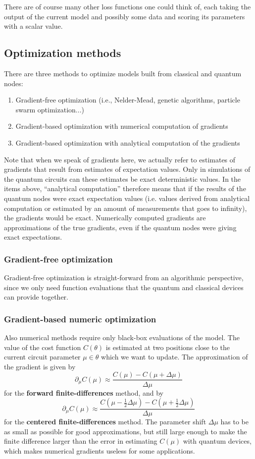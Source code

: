 \documentclass[aps,pra,10pt,twocolumn,groupedaddress,nofootinbib]{revtex4-1}
\theoremstyle{plain}
\begin{document}
There are of course many other loss functions one could think of, each taking the output of the current model and possibly some data and scoring its parameters with a scalar value.

\subsection{Optimization methods}

There are three methods to optimize models built from classical and quantum nodes:
\begin{enumerate}
\item Gradient-free optimization (i.e., Nelder-Mead, genetic algorithms, particle swarm optimization...)
\item Gradient-based optimization with numerical computation of gradients
\item Gradient-based optimization with analytical computation of the gradients
\end{enumerate}
Note that when we speak of gradients here, we actually refer to estimates of gradients that result from estimates of expectation values. Only in simulations of the quantum circuits can these estimates be exact deterministic values. In the items above, ``analytical computation'' therefore means that if the results of the quantum nodes were exact expectation values (i.e. values derived from analytical computation or estimated by an amount of measurements that goes to infinity), the gradients would be exact. Numerically computed gradients are approximations of the true gradients, even if the quantum nodes were giving exact expectations.

\subsubsection{Gradient-free optimization}
Gradient-free optimization is straight-forward from an algorithmic perspective, since we only need function evaluations that the quantum and classical devices can provide together.

\subsubsection{Gradient-based numeric optimization}

Also numerical methods require only black-box evaluations of the model. The value of the cost function $C(\theta)$ is estimated at two positions close to the current circuit parameter $\mu \in \theta$ which we want to update. The approximation of the gradient is given by
\[ \partial_{\mu} C(\mu) \approx \frac{C(\mu ) - C(\mu + \Delta \mu)}{\Delta \mu} \]
for the \textbf{forward finite-differences} method, and by
\[ \partial_{\mu} C(\mu) \approx \frac{C(\mu - \frac{1}{2}\Delta \mu ) - C(\mu + \frac{1}{2} \Delta \mu)}{\Delta \mu} \]
for the \textbf{centered finite-differences} method. The parameter shift $\Delta \mu$ has to be as small as possible for good approximations, but still large enough to make the finite difference larger than the error in estimating $C(\mu)$ with quantum devices, which makes numerical gradients useless for some applications.
\end{document}

